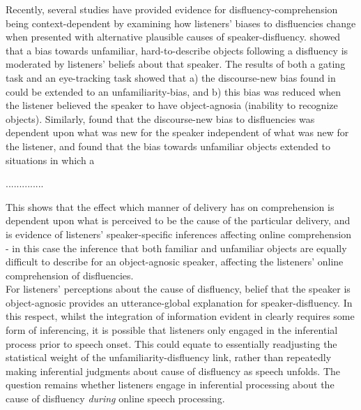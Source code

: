 \documentclass[man]{apa6}
\begin{document}
Recently, several studies have provided evidence for disfluency-comprehension being context-dependent by examining how listeners' biases to disfluencies change when presented with alternative plausible causes of speaker-disfluency. 
\citet{Arnold2007} showed that a bias towards unfamiliar, hard-to-describe objects following a disfluency is moderated by listeners' beliefs about that speaker. 
The results of both a gating task and an eye-tracking task showed that a) the discourse-new bias found in \citet{Arnold2004} could be extended to an unfamiliarity-bias, and b) this bias was reduced when the listener believed the speaker to have object-agnosia (inability to recognize objects). 
Similarly, \citet{Barr2010} found that the discourse-new bias to disfluencies was dependent upon what was new for the speaker independent of what was new for the listener, and \citet{Heller2015} found that the bias towards unfamiliar objects extended to situations in which a


..............


This shows that the effect which manner of delivery has on comprehension is dependent upon what is perceived to be the cause of the particular delivery, and is evidence of listeners' speaker-specific inferences affecting online comprehension - in this case the inference that both familiar and unfamiliar objects are equally difficult to describe for an object-agnosic speaker, affecting the listeners' online comprehension of disfluencies.\\

For listeners' perceptions about the cause of disfluency, belief that the speaker is object-agnosic provides an utterance-global explanation for speaker-disfluency. 
In this respect, whilst the integration of information evident in \citet{Arnold2007} clearly requires some form of inferencing, it is possible that listeners only engaged in the inferential process prior to speech onset. 
This could equate to essentially readjusting the statistical weight of the unfamiliarity-disfluency link, rather than repeatedly making inferential judgments about cause of disfluency as speech unfolds. 
The question remains whether listeners engage in inferential processing about the cause of disfluency \textit{during} online speech processing. \\
\end{document}
